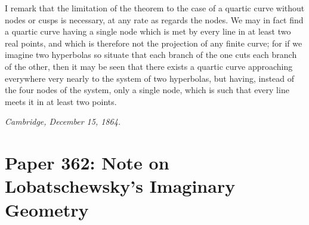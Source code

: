 \documentclass[11pt]{article}
\begin{document}
I remark that the limitation of the theorem to the case of a quartic curve without nodes or cusps is necessary, at any rate as regards the nodes. We may in fact find a quartic curve having a single node which is met by every line in at least two real points, and which is therefore not the projection of any finite curve; for if we imagine two hyperbolas so situate that each branch of the one cuts each branch of the other, then it may be seen that there exists a quartic curve approaching everywhere very nearly to the system of two hyperbolas, but having, instead of the four nodes of the system, only a single node, which is such that every line meets it in at least two points.

\medskip
\textit{Cambridge, December 15, 1864.}

\bigskip
\section*{Paper 362: Note on Lobatschewsky's Imaginary Geometry}

\medskip{}

\medskip
\end{document}
